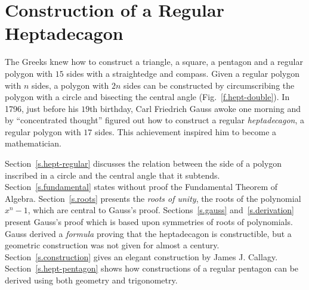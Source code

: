 

\chapter{Construction of a Regular Heptadecagon}\label{c.heptadecagon}




The Greeks knew how to construct a triangle, a square, a pentagon and a regular polygon with $15$ sides with a straightedge and compass. Given a regular polygon with $n$ sides, a polygon with $2n$ sides can be constructed by circumscribing the polygon with a circle and bisecting the central angle (Fig.~\ref{f.hept-double}). In 1796, just before his $19$th birthday, Carl Friedrich Gauss awoke one morning and by ``concentrated thought'' figured out how to construct a regular \emph{heptadecagon}, a regular polygon with $17$ sides. This achievement inspired him to become a mathematician.

Section~\ref{s.hept-regular} discusses the relation between the side of a polygon inscribed in a circle and the central angle that it subtends. Section~\ref{s.fundamental} states without proof the Fundamental Theorem of Algebra. Section~\ref{s.roots} presents the \emph{roots of unity}, the roots of the polynomial $x^n-1$, which are central to Gauss's proof. Sections~\ref{s.gauss} and~\ref{s.derivation} present Gauss's proof which is based upon symmetries of roots of polynomials. Gauss derived a \emph{formula} proving that the heptadecagon is constructible, but a geometric construction was not given for almost a century. Section~\ref{s.construction} gives an elegant construction by James J. Callagy. Section~\ref{s.hept-pentagon} shows how constructions of a regular pentagon can be derived using both geometry and trigonometry.

